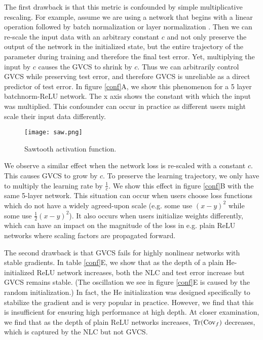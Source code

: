 \documentclass{article} %
\begin{document}
The first drawback is that this metric is confounded by simple multiplicative rescaling. For example, assume we are using a network that begins with a linear operation followed by batch normalization or layer normalization \citep{layerNormalization}. Then we can re-scale the input data with an arbitrary constant $c$ and not only preserve the output of the network in the initialized state, but the entire trajectory of the parameter during training and therefore the final test error. Yet, multiplying the input by $c$ causes the GVCS to shrink by $c$. Thus we can arbitrarily control GVCS while preserving test error, and therefore GVCS is unreliable as a direct predictor of test error. In figure \ref{conf}A, we show this phenomenon for a 5 layer batchnorm-ReLU network. The x axis shows the constant with which the input was multiplied. This confounder can occur in practice as different users might scale their input data differently.


\begin{wrapfigure}{r}{4.7cm}
\texttt{[image: saw.png]}
\caption{Sawtooth activation function.}\label{saw}
\end{wrapfigure} 


We observe a similar effect when the network loss is re-scaled with a constant $c$. This causes GVCS to grow by $c$. To preserve the learning trajectory, we only have to multiply the learning rate by $\frac{1}{c}$. We show this effect in figure \ref{conf}B with the same 5-layer network. This situation can occur when users choose loss functions which do not have a widely agreed-upon scale (e.g. some use $(x-y)^2$ while some use $\frac{1}{2}(x-y)^2$). It also occurs when users initialize weights differently, which can have an impact on the magnitude of the loss in e.g. plain ReLU networks where scaling factors are propagated forward.

The second drawback is that GVCS fails for highly nonlinear networks with stable gradients. In table \ref{conf}E, we show that as the depth of a plain He-initialized ReLU network increases, both the NLC and test error increase but GVCS remains stable. (The oscillation we see in figure \ref{conf}E is caused by the random initialization.) In fact, the He initialization was designed specifically to stabilize the gradient and is very popular in practice. However, we find that this is insufficient for ensuring high performance at high depth. At closer examination, we find that as the depth of plain ReLU networks increases, $\operatorname{Tr}(\mathrm{Cov}_f)$ decreases, which is captured by the NLC but not GVCS.
\end{document}
